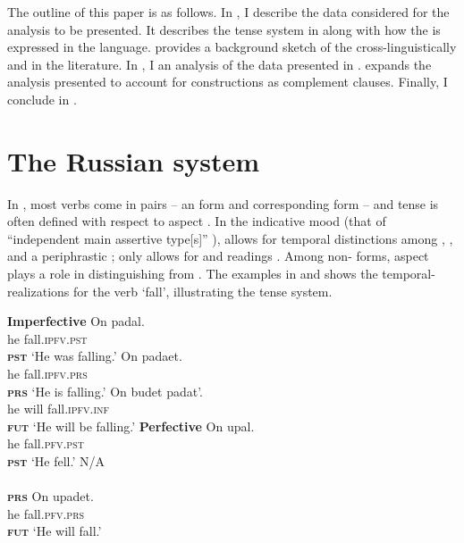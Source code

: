 \documentclass[output=paper,modfonts,newtxmath,hidelinks,]{langscibook}
\begin{document}
The outline of this paper is as follows. In , I describe the data considered for the analysis to be presented. It describes the tense system in  along with how the  is expressed in the language.  provides a background sketch of the  cross-linguistically and in the literature. In , I  an analysis of the data presented in .  expands the analysis presented to account for   constructions as complement clauses. Finally, I conclude in . 

\section{The Russian system}\label{10:s2}

In , most verbs come in  pairs \citep[371]{Mezhevich2008} – an  form and corresponding  form – and tense is often defined with respect to aspect \citep[373]{Mezhevich2008}. In the indicative mood (that of “independent main assertive  type[s]” \citep[1]{Wiltschko}),  allows for temporal distinctions among , , and a periphrastic ;  only allows for  and  readings \citep[371]{Mezhevich2008}. Among non- forms, aspect plays a role in distinguishing  from . The examples in  and  shows the temporal- realizations for the verb ‘fall’, illustrating the  tense system.

\begin{multicols}{2}
\ea \textbf{Imperfective}\label{10:ex:ipfv}
\ea\gll On padal.\\
he fall.\textsc{ipfv.pst}\\\hfill\textsc{\textbf{pst}}
\glt `He was falling.'
\ex\gll On padaet.\\
he fall.\textsc{ipfv.prs}\\\hfill\textsc{\textbf{prs}}
\glt `He is falling.'
\ex\gll On budet padat'.\\
he will fall.\textsc{ipfv.inf}\\\hfill\textsc{\textbf{fut}}
\glt `He will be falling.'
\z\z\columnbreak
\ea \textbf{Perfective}\label{10:ex:pfv}
\ea\gll On upal.\\
he fall.\textsc{pfv.pst}\\\hfill\textsc{\textbf{pst}}
\glt `He fell.'
\ex\gll N/A\\
{}\\\hfill\textsc{\textbf{prs}}
\glt {}\vspace{14pt}
\ex\gll On upadet.\\
he fall.\textsc{pfv.prs}\\\hfill\textsc{\textbf{fut}}
\glt `He will fall.'
\z\z

\end{multicols}
\end{document}
